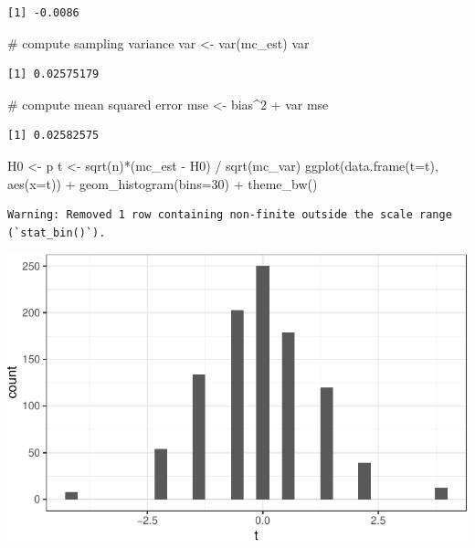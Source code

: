 \documentclass[
  letterpaper,
  DIV=11,
  numbers=noendperiod]{scrreprt}
\newenvironment{Shaded}{\begin{snugshade}}{\end{snugshade}}
\newcommand{\AttributeTok}[1]{\textcolor[rgb]{0.40,0.45,0.13}{#1}}
\newcommand{\CommentTok}[1]{\textcolor[rgb]{0.37,0.37,0.37}{#1}}
\newcommand{\DecValTok}[1]{\textcolor[rgb]{0.68,0.00,0.00}{#1}}
\newcommand{\FunctionTok}[1]{\textcolor[rgb]{0.28,0.35,0.67}{#1}}
\newcommand{\NormalTok}[1]{\textcolor[rgb]{0.00,0.23,0.31}{#1}}
\newcommand{\OtherTok}[1]{\textcolor[rgb]{0.00,0.23,0.31}{#1}}
\newcommand{\SpecialCharTok}[1]{\textcolor[rgb]{0.37,0.37,0.37}{#1}}
\begin{document}
\begin{verbatim}
[1] -0.0086
\end{verbatim}

\begin{Shaded}
\begin{Highlighting}[]
\CommentTok{\# compute sampling variance}
\NormalTok{var }\OtherTok{\textless{}{-}} \FunctionTok{var}\NormalTok{(mc\_est)}
\NormalTok{var}
\end{Highlighting}
\end{Shaded}

\begin{verbatim}
[1] 0.02575179
\end{verbatim}

\begin{Shaded}
\begin{Highlighting}[]
\CommentTok{\# compute mean squared error}
\NormalTok{mse }\OtherTok{\textless{}{-}}\NormalTok{ bias}\SpecialCharTok{\^{}}\DecValTok{2} \SpecialCharTok{+}\NormalTok{ var}
\NormalTok{mse}
\end{Highlighting}
\end{Shaded}

\begin{verbatim}
[1] 0.02582575
\end{verbatim}

\begin{Shaded}
\begin{Highlighting}[]
\NormalTok{H0 }\OtherTok{\textless{}{-}}\NormalTok{ p}
\NormalTok{t }\OtherTok{\textless{}{-}} \FunctionTok{sqrt}\NormalTok{(n)}\SpecialCharTok{*}\NormalTok{(mc\_est }\SpecialCharTok{{-}}\NormalTok{ H0) }\SpecialCharTok{/} \FunctionTok{sqrt}\NormalTok{(mc\_var)}
\FunctionTok{ggplot}\NormalTok{(}\FunctionTok{data.frame}\NormalTok{(}\AttributeTok{t=}\NormalTok{t), }\FunctionTok{aes}\NormalTok{(}\AttributeTok{x=}\NormalTok{t)) }\SpecialCharTok{+}
  \FunctionTok{geom\_histogram}\NormalTok{(}\AttributeTok{bins=}\DecValTok{30}\NormalTok{) }\SpecialCharTok{+}
  \FunctionTok{theme\_bw}\NormalTok{()}
\end{Highlighting}
\end{Shaded}

\begin{verbatim}
Warning: Removed 1 row containing non-finite outside the scale range
(`stat_bin()`).
\end{verbatim}

\includegraphics{07-inference_files/figure-pdf/unnamed-chunk-10-1.pdf}
\end{document}
